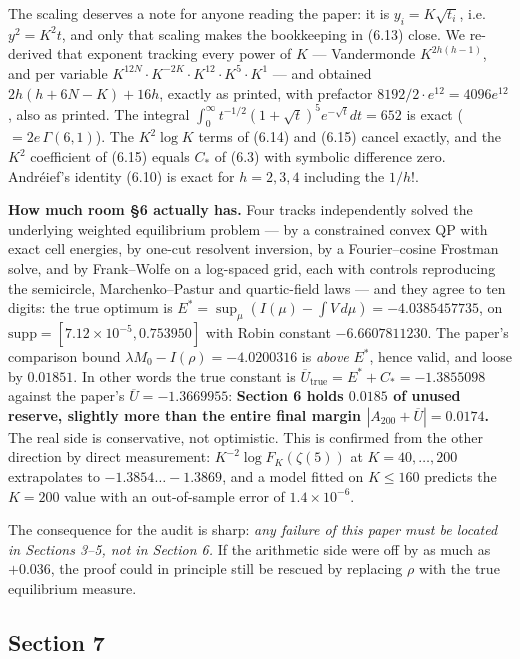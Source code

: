 \documentclass[11pt]{article}
\theoremstyle{definition}
\newcommand{\z}{\zeta(5)}
\newcommand{\Ub}{\overline{U}}
\begin{document}
The scaling deserves a note for anyone reading the paper: it is $y_i=K\sqrt{t_i}$, i.e.\
$y^2=K^2t$, and only that scaling makes the bookkeeping in (6.13) close. We re-derived that
exponent tracking every power of $K$ --- Vandermonde $K^{2h(h-1)}$, and per variable
$K^{12N}\cdot K^{-2K}\cdot K^{12}\cdot K^5\cdot K^1$ --- and obtained
$2h(h+6N-K)+16h$, exactly as printed, with prefactor $8192/2\cdot e^{12}=4096e^{12}$, also as
printed. The integral $\int_0^\infty t^{-1/2}(1+\sqrt t)^5e^{-\sqrt t}dt=652$ is exact
($=2e\,\Gamma(6,1)$). The $K^2\log K$ terms of (6.14) and (6.15) cancel exactly, and the
$K^2$ coefficient of (6.15) equals $C_*$ of (6.3) with symbolic difference zero. Andr\'eief's
identity (6.10) is exact for $h=2,3,4$ including the $1/h!$.

\textbf{How much room \S6 actually has.} Four tracks independently solved the underlying weighted
equilibrium problem --- by a constrained convex QP with exact cell energies, by one-cut resolvent
inversion, by a Fourier--cosine Frostman solve, and by Frank--Wolfe on a log-spaced grid, each
with controls reproducing the semicircle, Marchenko--Pastur and quartic-field laws --- and they
agree to ten digits: the true optimum is
$E^*=\sup_\mu(I(\mu)-\int V\,d\mu)=-4.0385457735$, on $\mathrm{supp}=[7.12\times10^{-5},0.753950]$
with Robin constant $-6.6607811230$. The paper's comparison bound $\lambda M_0-I(\rho)=-4.0200316$
is \emph{above} $E^*$, hence valid, and loose by $0.01851$. In other words the true constant is
$\Ub_{\mathrm{true}}=E^*+C_*=-1.3855098$ against the paper's $\Ub=-1.3669955$: \textbf{Section 6
holds $0.0185$ of unused reserve, slightly more than the entire final margin
$|A_{200}+\Ub|=0.0174$.} The real side is conservative, not optimistic. This is confirmed from
the other direction by direct measurement: $K^{-2}\log F_K(\z)$ at $K=40,\dots,200$ extrapolates
to $-1.3854\ldots-1.3869$, and a model fitted on $K\le160$ predicts the $K=200$ value with an
out-of-sample error of $1.4\times10^{-6}$.

The consequence for the audit is sharp: \emph{any failure of this paper must be located in
Sections 3--5, not in Section 6.} If the arithmetic side were off by as much as $+0.036$, the
proof could in principle still be rescued by replacing $\rho$ with the true equilibrium measure.

\subsection{Section 7}
\end{document}
